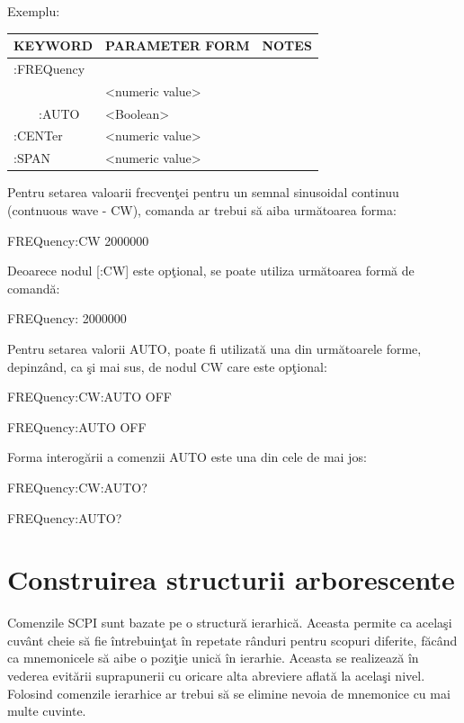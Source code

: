 Exemplu:
\begin{table}[h]
	\begin{center}
	\begin{tabular}{|l|l|l|}
		\hline
		KEYWORD & PARAMETER FORM & NOTES\\
		\hline
		:FREQuency &  & \\
		\verb [:CW] & \textless numeric value\textgreater & \\
		\ \ \ \ :AUTO & \textless Boolean\textgreater & \\
		:CENTer & \textless numeric value\textgreater & \\
		:SPAN & \textless numeric value\textgreater & \\
		\hline		
	\end{tabular}
	\end{center}
\end{table}

Pentru setarea valoarii frecven\c{t}ei pentru un semnal sinusoidal continuu (contnuous wave - CW), comanda ar trebui s\u{a} aiba urm\u{a}toarea forma: 
\begin{center}
FREQuency:CW 2000000
\end{center}
Deoarece nodul [:CW] este op\c{t}ional, se poate utiliza urm\u{a}toarea form\u{a} de comand\u{a}: 
\begin{center}
FREQuency: 2000000
\end{center}
Pentru setarea valorii AUTO, poate fi utilizat\u{a} una din urm\u{a}toarele forme, depinz\^{a}nd, ca \c{s}i mai sus, de nodul CW care este op\c{t}ional:
\begin{center}
FREQuency:CW:AUTO OFF

FREQuency:AUTO OFF
\end{center}
Forma interog\u{a}rii a comenzii AUTO este una din cele de mai jos: 
\begin{center}
FREQuency:CW:AUTO?

FREQuency:AUTO?
\end{center}

\section{Construirea structurii arborescente}
Comenzile SCPI sunt bazate pe o structur\u{a} ierarhic\u{a}. Aceasta permite ca acela\c{s}i cuv\^{a}nt cheie s\u{a} fie \^{i}ntrebuin\c{t}at \^{i}n repetate r\^{a}nduri pentru scopuri diferite, f\u{a}c\^{a}nd ca mnemonicele s\u{a} aibe o pozi\c{t}ie unic\u{a} \^{i}n ierarhie. Aceasta se realizeaz\u{a} \^{i}n vederea evit\u{a}rii suprapunerii cu oricare alta abreviere aflat\u{a} la acela\c{s}i nivel. Folosind comenzile ierarhice ar trebui s\u{a} se elimine nevoia de mnemonice cu mai multe cuvinte.

